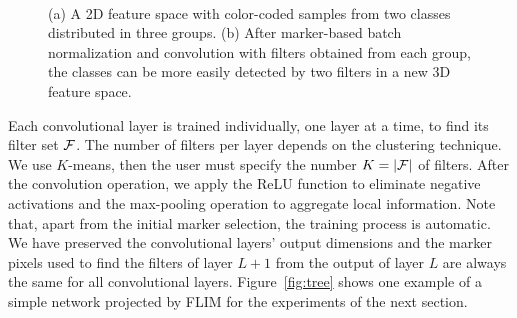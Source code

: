 \documentclass[a4paper,conference]{IEEEtran}
\begin{document}
\begin{figure}[!ht]
  \centering
  ~
  \caption{(a) A 2D feature space with color-coded samples from two classes distributed in three groups. (b) After marker-based batch normalization and convolution with filters obtained from each group, the classes can be more easily detected by two filters in a new 3D feature space.}
  \label{fig:filter}
\end{figure}

Each convolutional layer is trained individually, one layer at a time, to find its filter set ${\cal F}$. The number of filters per layer depends on the clustering technique. We use $K$-means, then the user must specify the number $K=|{\cal F}|$ of filters. After the convolution operation, we apply the ReLU function to eliminate negative activations and the max-pooling operation to aggregate local information. Note that, apart from the initial marker selection, the training process is automatic. We have preserved the convolutional layers' output dimensions and the marker pixels used to find the filters of layer $L+1$ from the output of layer $L$ are always the same for all convolutional layers. Figure~\ref{fig:tree} shows one example of a simple network projected by FLIM for the experiments of the next section. 
\end{document}
